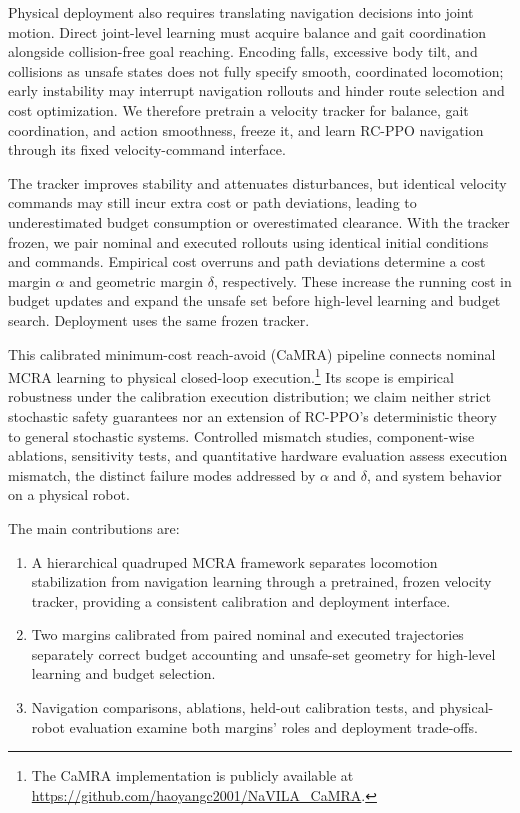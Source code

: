 \documentclass[conference]{IEEEtran}
\begin{document}
Physical deployment also requires translating navigation decisions into joint
motion. Direct joint-level learning must acquire balance and gait coordination
alongside collision-free goal reaching. Encoding falls, excessive body tilt, and
collisions as unsafe states does not fully specify smooth, coordinated locomotion;
early instability may interrupt navigation rollouts and hinder route selection
and cost optimization. We therefore pretrain a velocity tracker for balance,
gait coordination, and action smoothness, freeze it, and learn RC-PPO navigation
through its fixed velocity-command interface.

The tracker improves stability and attenuates disturbances, but identical velocity
commands may still incur extra cost or path deviations, leading to underestimated
budget consumption or overestimated clearance. With the tracker frozen, we pair
nominal and executed rollouts using identical initial conditions and commands.
Empirical cost overruns and path deviations determine a cost margin $\alpha$ and
geometric margin $\delta$, respectively. These increase the running cost in
budget updates and expand the unsafe set before high-level learning and budget
search. Deployment uses the same frozen tracker.

This calibrated minimum-cost reach-avoid (CaMRA) pipeline connects nominal MCRA
learning to physical closed-loop execution.\footnote{The CaMRA implementation
is publicly available at \url{https://github.com/haoyangc2001/NaVILA_CaMRA}.} Its scope is empirical robustness
under the calibration execution distribution; we claim neither strict stochastic
safety guarantees nor an extension of RC-PPO's deterministic theory to general
stochastic systems. Controlled mismatch studies, component-wise ablations,
sensitivity tests, and quantitative hardware evaluation assess execution
mismatch, the distinct failure modes addressed by $\alpha$ and $\delta$, and
system behavior on a physical robot.

The main contributions are:
\begin{enumerate}
\item A hierarchical quadruped MCRA framework separates locomotion stabilization
      from navigation learning through a pretrained, frozen velocity tracker,
      providing a consistent calibration and deployment interface.
\item Two margins calibrated from paired nominal and executed trajectories
      separately correct budget accounting and unsafe-set geometry for
      high-level learning and budget selection.
\item Navigation comparisons, ablations, held-out calibration tests, and
      physical-robot evaluation examine both margins' roles and deployment
      trade-offs.
\end{enumerate}
\end{document}
